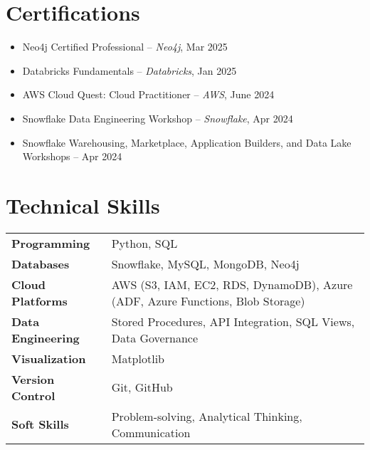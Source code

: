 \documentclass[11pt,a4paper]{article}
\begin{document}



\section*{Certifications}

\begin{itemize}
  \item Neo4j Certified Professional – \textit{Neo4j}, Mar 2025
  \item Databricks Fundamentals – \textit{Databricks}, Jan 2025
  \item AWS Cloud Quest: Cloud Practitioner – \textit{AWS}, June 2024
  \item Snowflake Data Engineering Workshop – \textit{Snowflake}, Apr 2024
  \item Snowflake Warehousing, Marketplace, Application Builders, and Data Lake Workshops – Apr 2024
\end{itemize}

\section*{Technical Skills}

\begin{tabular}{@{}ll}
\textbf{Programming}       & Python, SQL \\[6pt]
\textbf{Databases}         & Snowflake, MySQL, MongoDB, Neo4j \\[6pt]
\textbf{Cloud Platforms}   & AWS (S3, IAM, EC2, RDS, DynamoDB), Azure (ADF, Azure Functions, Blob Storage) \\[6pt]
\textbf{Data Engineering}  & Stored Procedures, API Integration, SQL Views, Data Governance \\[6pt]
\textbf{Visualization}     & Matplotlib \\[6pt]
\textbf{Version Control}   & Git, GitHub \\[6pt]
\textbf{Soft Skills}       & Problem-solving, Analytical Thinking, Communication
\end{tabular}
\end{document}
